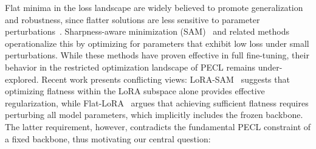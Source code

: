 \documentclass{article}
\theoremstyle{plain}
\theoremstyle{definition}
\theoremstyle{remark}
\begin{document}
Flat minima in the loss landscape are widely believed to promote generalization and robustness, since flatter solutions are less sensitive to parameter perturbations~\citep{FlatMinima1997,wu2017understandinggeneralizationdeeplearning,chaudhariEntropySGDBiasingGradient2019,NEURIPS2020_518a38cc,NEURIPS2021_995f5e03,JMLRAnEmpiricalInvestigatio,yangRevisitingFlatnessAwareOptimization2025}.
Sharpness-aware minimization (SAM)~\cite{foretSharpnessAwareMinimizationEfficiently2021} and related methods~\citep{pmlr-v151-bisla22a,zhangGradientNormAware2023,NEURIPS2024_C-Flat} operationalize this by optimizing for parameters that exhibit low loss under small perturbations. 
While these methods have proven effective in full fine-tuning, their behavior in the restricted optimization landscape of PECL remains under-explored. 
Recent work presents conflicting views: LoRA-SAM~\citep{NEURIPS2024_4eb2c0ad} suggests that optimizing flatness within the LoRA subspace alone provides effective regularization, while Flat-LoRA~\citep{li2025flatloralowrankadaptationflat} argues that achieving sufficient flatness requires perturbing all model parameters, which implicitly includes the frozen backbone. The latter requirement, however, contradicts the fundamental PECL constraint of a fixed backbone, thus motivating our central question:


\end{document}
